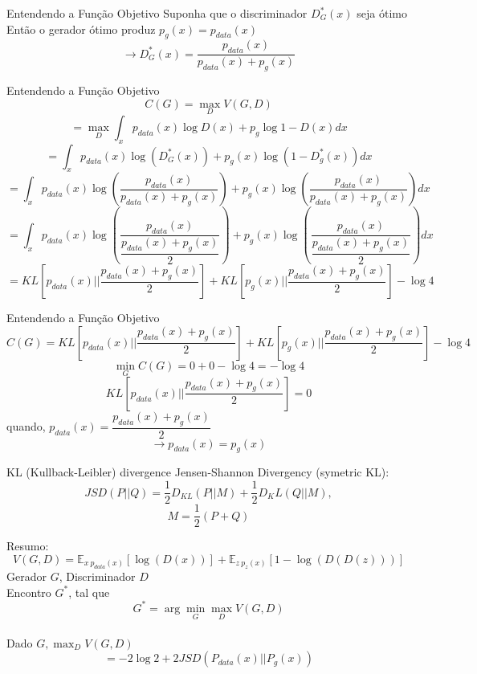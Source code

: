 \documentclass[10pt]{beamer}
\begin{document}
\begin{frame}[fragile]{Entendendo a Função Objetivo}
 Suponha que o discriminador $D^*_G(x)$ seja ótimo\\
 Então o gerador ótimo produz $p_g(x) = p_{data}(x)$ \\
 $$\rightarrow D^*_G(x) = \dfrac{p_{data}(x)}{p_{data}(x) + p_g(x)}$$
\end{frame}

\begin{frame}[fragile]{Entendendo a Função Objetivo}
  $$C(G) = \max_{D}V(G,D)$$
  \pause
  $$= \max_{D} \int_{x}p_{data}(x)\log{D(x)} + p_{g}\log{1-D(x)}dx $$
  \pause
  $$= \int_{x}p_{data}(x)\log{\left(D_{G}^{*}(x)\right)} + p_{g}(x)\log{\left(1-D_{g}^{*}(x)\right)}dx $$
  \pause
  $$= \int_{x}p_{data}(x)\log{\left(\dfrac{p_{data}(x)}{p_{data}(x) + p_{g}(x)}\right)} + p_{g}(x)\log{\left(\dfrac{p_{data}(x)}{p_{data}(x) + p_{g}(x)}\right)}dx $$
  \pause
  $$= \int_{x}p_{data}(x)\log{\left(\dfrac{p_{data}(x)}{\dfrac{p_{data}(x) + p_{g}(x)}{2}}\right)} + p_{g}(x)\log{\left(\dfrac{p_{data}(x)}{\dfrac{p_{data}(x) + p_{g}(x)}{2}}\right)}dx	$$
  \pause
  $$= KL\left[p_{data}(x)||\dfrac{p_{data}(x)+p_g(x)}{2}\right] + KL\left[p_g(x)||\dfrac{p_{data}(x) + p_g(x)}{2}\right] - \log{4} $$
\end{frame}

\begin{frame}[fragile]{Entendendo a Função Objetivo}
  $$C(G) = KL\left[p_{data}(x)||\frac{p_{data}(x)+p_g(x)}{2}\right] + KL\left[p_g(x)||\frac{p_{data}(x) + p_g(x)}{2}\right] - \log{4}$$
  \pause
  $$\min_G C(G) = 0+0-\log{4} = -\log{4} $$
  $$KL\left[p_{data}(x)||\dfrac{p_{data}(x) + p_g(x)}{2}\right] = 0$$
  \pause
  quando, $p_{data}(x) = \dfrac{p_{data}(x)+p_g(x)}{2}$
  \pause
  $$\rightarrow p_{data}(x) = p_g(x)$$
\end{frame}

\begin{frame}[fragile]{KL (Kullback-Leibler) divergence}
  Jensen-Shannon Divergency (symetric KL):
  $$JSD(P||Q) = \frac{1}{2}D_{KL}(P||M) + \frac{1}{2}D_KL(Q||M),$$
  $$M = \frac{1}{2}(P+Q)$$
\end{frame}

\begin{frame}[fragile]{Resumo:}
  $$V(G,D) = \mathbb{E}_{x~p_{data}(x)}\left[\log{(D(x))}\right]+\mathbb{E}_{z~p_z(x)}\left[1-\log{(D(D(z)))}\right]$$
  Gerador $G$, Discriminador $D$ \\
  Encontro $G^*$, tal que \\
  $$G^* = \arg{\min_G \max_D} V(G,D)$$\\
  Dado $G, \max_{D}V(G,D)$
  $$= -2\log{2} + 2JSD(P_{data}(x)||P_g(x))$$
\end{frame}
\end{document}
